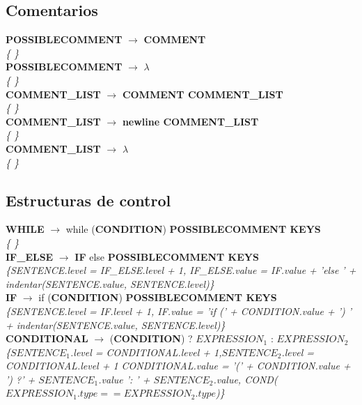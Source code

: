 \documentclass[10pt,a4paper]{article}
\begin{document}
\subsection{Comentarios}

\textbf{POSSIBLECOMMENT} $\rightarrow$ \textbf{COMMENT} \\
\textit{\{   \}} \\

\textbf{POSSIBLECOMMENT} $\rightarrow$ $\lambda$ \\
\textit{\{   \}} \\

\textbf{COMMENT\_LIST} $\rightarrow$ \textbf{COMMENT COMMENT\_LIST } \\
\textit{\{   \}} \\

\textbf{COMMENT\_LIST} $\rightarrow$ \textbf{newline COMMENT\_LIST } \\
\textit{\{   \}} \\

\textbf{COMMENT\_LIST} $\rightarrow$ $\lambda$ \\
\textit{\{   \}} \\

\subsection{Estructuras de control}
\textbf{WHILE} $\rightarrow$ while (\textbf{CONDITION}) \textbf{POSSIBLECOMMENT KEYS} \\
\textit{\{   \}} \\

\textbf{IF\_ELSE} $\rightarrow$ \textbf{IF} else \textbf{POSSIBLECOMMENT KEYS} \\
\textit{\{SENTENCE.level = IF\_ELSE.level + 1, IF\_ELSE.value = IF.value + 'else ' + indentar(SENTENCE.value, SENTENCE.level)\}} \\

\textbf{IF} $\rightarrow$ if (\textbf{CONDITION}) \textbf{POSSIBLECOMMENT KEYS} \\
\textit{\{SENTENCE.level = IF.level + 1, IF.value = 'if (' + CONDITION.value + ') ' + indentar(SENTENCE.value, SENTENCE.level)\}} \\

\textbf{CONDITIONAL} $\rightarrow$ (\textbf{CONDITION}) ? \textbf{$EXPRESSION_{1}$} : \textbf{$EXPRESSION_{2}$}  \\
\textit{\{$SENTENCE_{1}$.level = CONDITIONAL.level + 1,$SENTENCE_{2}$.level = CONDITIONAL.level + 1 CONDITIONAL.value = '(' + CONDITION.value + ') ?' + $SENTENCE_{1}$.value ': '  + $SENTENCE_{2}$.value, COND($EXPRESSION_{1}.type == EXPRESSION_{2}.type$)\}}\\
	
\end{document}

